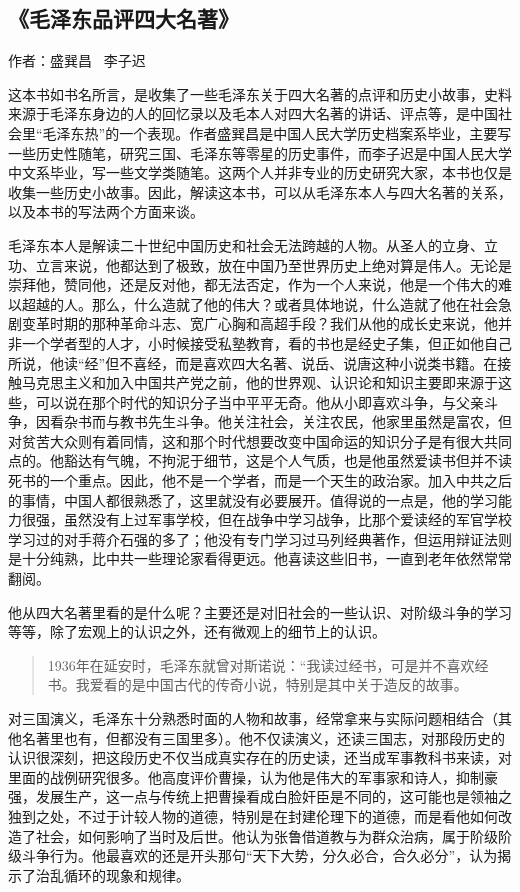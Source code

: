 \subsection{《毛泽东品评四大名著》}

作者：盛巽昌 \ 李子迟

这本书如书名所言，是收集了一些毛泽东关于四大名著的点评和历史小故事，史料来源于毛泽东身边的人的回忆录以及毛本人对四大名著的讲话、评点等，是中国社会里“毛泽东热”的一个表现。作者盛巽昌是中国人民大学历史档案系毕业，主要写一些历史性随笔，研究三国、毛泽东等零星的历史事件，而李子迟是中国人民大学中文系毕业，写一些文学类随笔。这两个人并非专业的历史研究大家，本书也仅是收集一些历史小故事。因此，解读这本书，可以从毛泽东本人与四大名著的关系，以及本书的写法两个方面来谈。

毛泽东本人是解读二十世纪中国历史和社会无法跨越的人物。从圣人的立身、立功、立言来说，他都达到了极致，放在中国乃至世界历史上绝对算是伟人。无论是崇拜他，赞同他，还是反对他，都无法否定，作为一个人来说，他是一个伟大的难以超越的人。那么，什么造就了他的伟大？或者具体地说，什么造就了他在社会急剧变革时期的那种革命斗志、宽广心胸和高超手段？我们从他的成长史来说，他并非一个学者型的人才，小时候接受私塾教育，看的书也是经史子集，但正如他自己所说，他读“经”但不喜经，而是喜欢四大名著、说岳、说唐这种小说类书籍。在接触马克思主义和加入中国共产党之前，他的世界观、认识论和知识主要即来源于这些，可以说在那个时代的知识分子当中平平无奇。他从小即喜欢斗争，与父亲斗争，因看杂书而与教书先生斗争。他关注社会，关注农民，他家里虽然是富农，但对贫苦大众则有着同情，这和那个时代想要改变中国命运的知识分子是有很大共同点的。他豁达有气魄，不拘泥于细节，这是个人气质，也是他虽然爱读书但并不读死书的一个重点。因此，他不是一个学者，而是一个天生的政治家。加入中共之后的事情，中国人都很熟悉了，这里就没有必要展开。值得说的一点是，他的学习能力很强，虽然没有上过军事学校，但在战争中学习战争，比那个爱读经的军官学校学习过的对手蒋介石强的多了；他没有专门学习过马列经典著作，但运用辩证法则是十分纯熟，比中共一些理论家看得更远。他喜读这些旧书，一直到老年依然常常翻阅。

他从四大名著里看的是什么呢？主要还是对旧社会的一些认识、对阶级斗争的学习等等，除了宏观上的认识之外，还有微观上的细节上的认识。

\begin{quotation}
1936年在延安时，毛泽东就曾对斯诺说：“我读过经书，可是并不喜欢经书。我爱看的是中国古代的传奇小说，特别是其中关于造反的故事。
\end{quotation}

对三国演义，毛泽东十分熟悉时面的人物和故事，经常拿来与实际问题相结合（其他名著里也有，但都没有三国里多）。他不仅读演义，还读三国志，对那段历史的认识很深刻，把这段历史不仅当成真实存在的历史读，还当成军事教科书来读，对里面的战例研究很多。他高度评价曹操，认为他是伟大的军事家和诗人，抑制豪强，发展生产，这一点与传统上把曹操看成白脸奸臣是不同的，这可能也是领袖之独到之处，不过于计较人物的道德，特别是在封建伦理下的道德，而是看他如何改造了社会，如何影响了当时及后世。他认为张鲁借道教与为群众治病，属于阶级阶级斗争行为。他最喜欢的还是开头那句“天下大势，分久必合，合久必分”，认为揭示了治乱循环的现象和规律。

